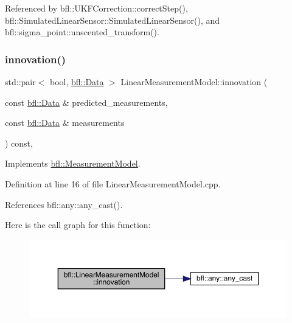 Referenced by bfl\+::\+U\+K\+F\+Correction\+::correct\+Step(), bfl\+::\+Simulated\+Linear\+Sensor\+::\+Simulated\+Linear\+Sensor(), and bfl\+::sigma\+\_\+point\+::unscented\+\_\+transform().

\mbox{\label{classbfl_1_1LinearMeasurementModel_a12485b4b6d511e97e338a4db6861b277}} 
\subsubsection{\texorpdfstring{innovation()}{innovation()}}
{\footnotesize\ttfamily std\+::pair$<$ bool, \mbox{\hyperlink{namespacebfl_af6b103c6821db1b54452f776fdd9dd02}{bfl\+::\+Data}} $>$ Linear\+Measurement\+Model\+::innovation (\begin{DoxyParamCaption}\item[{const \mbox{\hyperlink{namespacebfl_af6b103c6821db1b54452f776fdd9dd02}{bfl\+::\+Data}} \&}]{predicted\+\_\+measurements,  }\item[{const \mbox{\hyperlink{namespacebfl_af6b103c6821db1b54452f776fdd9dd02}{bfl\+::\+Data}} \&}]{measurements }\end{DoxyParamCaption}) const\hspace{0.3cm}{\ttfamily [override]}, {\ttfamily [virtual]}}



Implements \mbox{\hyperlink{classbfl_1_1MeasurementModel_aa06e0643805551a981bcc013ad44c829}{bfl\+::\+Measurement\+Model}}.



Definition at line 16 of file Linear\+Measurement\+Model.\+cpp.



References bfl\+::any\+::any\+\_\+cast().

Here is the call graph for this function\+:
\nopagebreak
\begin{figure}[H]
\begin{center}
\leavevmode
\includegraphics[width=350pt]{classbfl_1_1LinearMeasurementModel_a12485b4b6d511e97e338a4db6861b277_cgraph}
\end{center}
\end{figure}
\mbox{\label{classbfl_1_1Logger_ad44f46593cb8c4c87c1178eb326e2f64}} 
